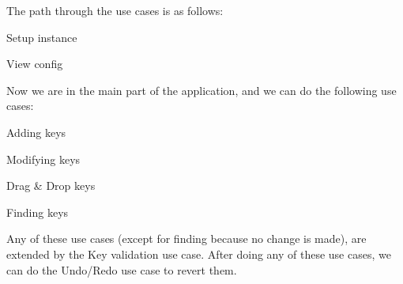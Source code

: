 The path through the use cases is as follows\+:


\begin{DoxyItemize}
\item Setup instance
\item View config
\end{DoxyItemize}

Now we are in the main part of the application, and we can do the following use cases\+:


\begin{DoxyItemize}
\item Adding keys
\item Modifying keys
\item Drag \& Drop keys
\item Finding keys
\end{DoxyItemize}

Any of these use cases (except for finding because no change is made), are extended by the Key validation use case. After doing any of these use cases, we can do the Undo/\+Redo use case to revert them. 